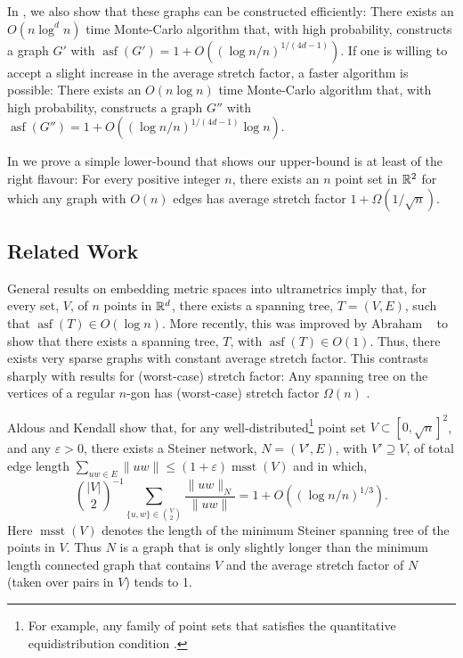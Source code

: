 \documentclass{patmorin}
\DeclareMathOperator{\asf}{asf}
\DeclareMathOperator{\msst}{msst}
\newcommand{\eps}{\varepsilon}
\begin{document}
In , we also show that these graphs can be
constructed efficiently:  There exists an $O(n\log^d n)$ time Monte-Carlo
algorithm that, with high probability, constructs a graph $G'$ with
$\asf(G')=1+O((\log n/n)^{1/(4d-1)})$.  If one is willing to accept a
slight increase in the average stretch factor, a faster algorithm is
possible: There exists an $O(n\log n)$ time Monte-Carlo algorithm that,
with high probability, constructs a graph $G''$ with $\asf(G'')=1+O((\log
n/n)^{1/(4d-1)}\log n)$.

In  we prove a simple lower-bound that shows our
upper-bound is at least of the right flavour:  For every positive integer
$n$, there exists an $n$ point set in $\mathbb{R}^2$ for which any graph with
$O(n)$ edges has average stretch factor $1+\Omega(1/\sqrt{n})$.

\subsection{Related Work}

General results on embedding metric spaces into ultrametrics
\cite{bartal:graph,fakcharoenphol.rao.ea:tight} imply that, for every set, 
$V$,  of $n$ points in $\mathbb{R}^d$, there exists a spanning tree, $T=(V,E)$, such
that $\asf(T)\in O(\log n)$.  More recently, this was improved by Abraham
\etal\ \cite{abraham.bartal.ea:metric,abraham.bartal.ea:embedding} to show
that there exists a spanning tree, $T$, with $\asf(T)\in O(1)$.  Thus,
there exists very sparse graphs with constant average stretch factor.
This contrasts sharply with results for (worst-case) stretch factor:
Any spanning tree on the vertices of a regular $n$-gon has (worst-case)
stretch factor $\Omega(n)$ \cite[Lemma~15]{eppstein:spanning-report}.

Aldous and Kendall \cite[Section~5.3]{aldous.kendall:short-length}
show that, for any well-distributed\footnote{For example, any
family of point sets that satisfies the quantitative equidistribution
condition \cite[Definition~3]{aldous.kendall:short-length}.} point set
$V\subset[0,\sqrt{n}]^2$, and any $\eps > 0$, there exists a Steiner
network, $N=(V',E)$, with $V'\supseteq V$, of total edge length
$\sum_{uw\in E}\|uw\| \le (1+\eps)\msst(V)$ and in which,
\[
    \binom{|V|}{2}^{-1}\sum_{\{u,w\}\in \binom{V}{2}}\frac{\|uw\|_N}{\|uw\|} = 1 + O((\log n/n)^{1/3}) .
\]
Here $\msst(V)$ denotes the length of the minimum Steiner spanning tree
of the points in $V$.  Thus $N$ is a graph that is only slightly longer
than the minimum length connected graph that contains $V$ and the average
stretch factor of $N$ (taken over pairs in $V$) tends to 1.
\end{document}
